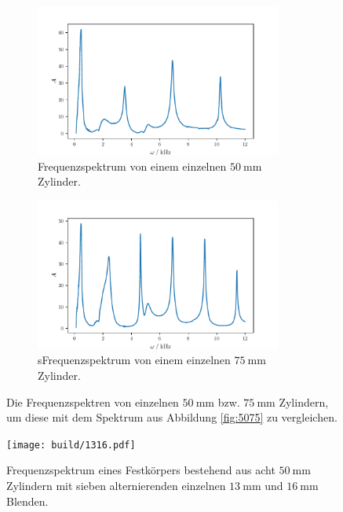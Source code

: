 \begin{figure}
    \begin{subfigure}{0.48\textwidth}%
        \centering%
        \includegraphics[height=5cm]{build/50single.pdf}%
        \caption{Frequenzspektrum von einem einzelnen $\qty{50}{\milli\meter}$ Zylinder.}%
        \label{fig:50sinlge}%
    \end{subfigure}%
    \hfill%
    \begin{subfigure}{0.48\textwidth}%
        \centering%
        \includegraphics[height=5cm]{build/75single.pdf}%
        \caption{sFrequenzspektrum von einem einzelnen $\qty{75}{\milli\meter}$ Zylinder.}%
        \label{fig:75single}%
    \end{subfigure}%
    \caption{Die Frequenzspektren von einzelnen $\qty{50}{\milli\meter}$ bzw. $\qty{75}{\milli\meter}$ Zylindern, um diese mit dem Spektrum
    aus Abbildung \ref{fig:5075} zu vergleichen.}%
    \label{fig:75and50single}
\end{figure}%
\begin{figure}
    \centering
    \texttt{[image: build/1316.pdf]}
    \caption{Frequenzspektrum eines Festkörpers bestehend aus acht $\qty{50}{\milli\meter}$ Zylindern mit sieben alternierenden einzelnen $\qty{13}{\milli\meter}$ und 
    $\qty{16}{\milli\meter}$ Blenden.}
    \label{fig:1316}
\end{figure}